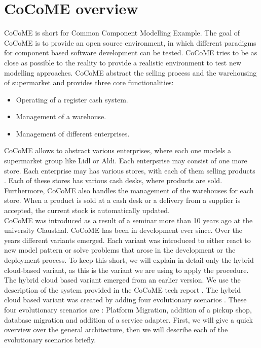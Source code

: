 \section{CoCoME overview}
\label{cocome_overview}
CoCoME is short for Common Component Modelling Example. The goal of CoCoME is to provide an open source environment, in which different paradigms for component based software development can be tested. CoCoME tries to be as close as possible to the reality to provide a realistic environment to test new modelling approaches. %
CoCoME abstract the selling process and the warehousing of supermarket and provides three core functionalities:
\begin{itemize}
\item Operating of a register cash system.
\item Management of a warehouse.
\item Management of different enterprises.
\end{itemize}
CoCoME allows to abstract various enterprises, where each one models a supermarket group like Lidl or Aldi. Each enterpsrise may consist of one more store. Each enterprise may has various stores, with each of them selling products . Each of these stores has various cash desks, where products are sold. Furthermore, CoCoME also handles the management of the warehouses for each store. When a product is sold at a cash desk or a delivery from a supplier is accepted, the current stock is automatically updated. \\ CoCoME was introduced as a result of a seminar more than 10 years ago at the university Clausthal. CoCoME has been in development ever since. Over the years different variants emerged. Each variant was introduced to either react to new model pattern or solve problems that arose in the development or the deployment process. To keep this short, we will explain in detail only the hybrid cloud-based variant, as this is the variant we are using to apply the procedure. \\
The hybrid cloud based variant emerged from an earlier version. We use the description of the system provided in the CoCoME tech report \cite{CoCoMETechReport}. The hybrid cloud based variant was created by adding four evolutionary scenarios . These four evolutionary scenarios are : Platform Migration, addition of a pickup shop, database migration and addition of a service adapter. First, we will give a quick overview over the general architecture, then we will describe each of the evolutionary scenarios briefly.\\
